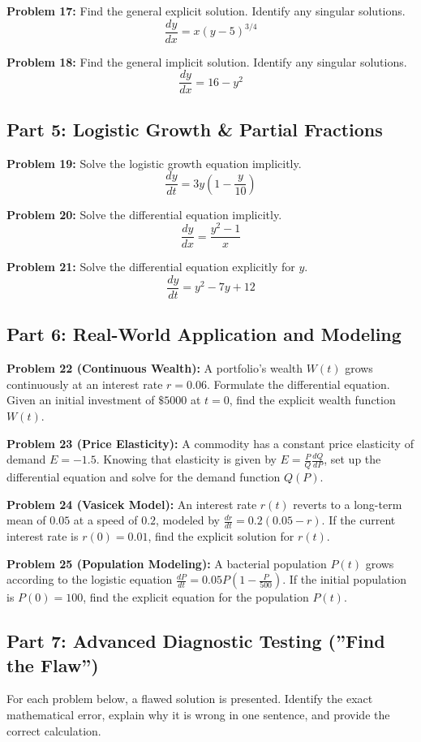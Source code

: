 \documentclass[11pt]{article}
\begin{document}
\textbf{Problem 17:} Find the general explicit solution. Identify any singular solutions.
\[ \frac{dy}{dx} = x(y-5)^{3/4} \]

\textbf{Problem 18:} Find the general implicit solution. Identify any singular solutions.
\[ \frac{dy}{dx} = 16 - y^2 \]

\subsection*{Part 5: Logistic Growth \& Partial Fractions}
\textbf{Problem 19:} Solve the logistic growth equation implicitly.
\[ \frac{dy}{dt} = 3y\left(1 - \frac{y}{10}\right) \]

\textbf{Problem 20:} Solve the differential equation implicitly.
\[ \frac{dy}{dx} = \frac{y^2 - 1}{x} \]

\textbf{Problem 21:} Solve the differential equation explicitly for $y$.
\[ \frac{dy}{dt} = y^2 - 7y + 12 \]

\subsection*{Part 6: Real-World Application and Modeling}
\textbf{Problem 22 (Continuous Wealth):} A portfolio's wealth $W(t)$ grows continuously at an interest rate $r = 0.06$. Formulate the differential equation. Given an initial investment of $\$5000$ at $t=0$, find the explicit wealth function $W(t)$.

\textbf{Problem 23 (Price Elasticity):} A commodity has a constant price elasticity of demand $E = -1.5$. Knowing that elasticity is given by $E = \frac{P}{Q}\frac{dQ}{dP}$, set up the differential equation and solve for the demand function $Q(P)$.

\textbf{Problem 24 (Vasicek Model):} An interest rate $r(t)$ reverts to a long-term mean of $0.05$ at a speed of $0.2$, modeled by $\frac{dr}{dt} = 0.2(0.05 - r)$. If the current interest rate is $r(0) = 0.01$, find the explicit solution for $r(t)$.

\textbf{Problem 25 (Population Modeling):} A bacterial population $P(t)$ grows according to the logistic equation $\frac{dP}{dt} = 0.05 P \left(1 - \frac{P}{500}\right)$. If the initial population is $P(0) = 100$, find the explicit equation for the population $P(t)$.

\subsection*{Part 7: Advanced Diagnostic Testing (''Find the Flaw'')}
For each problem below, a flawed solution is presented. Identify the exact mathematical error, explain why it is wrong in one sentence, and provide the correct calculation.
\end{document}
